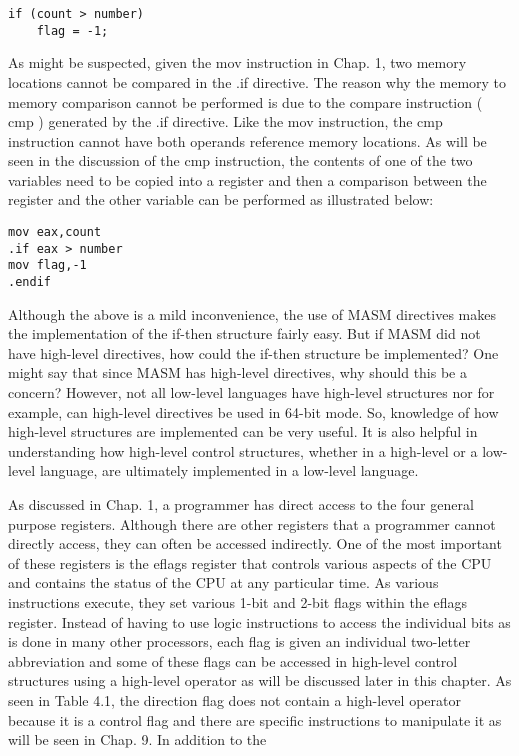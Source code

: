 \documentclass[10pt]{article}
\begin{document}
\begin{verbatim}
if (count > number)
    flag = -1;
\end{verbatim}

As might be suspected, given the mov instruction in Chap. 1, two memory locations cannot be compared in the .if directive. The reason why the memory to memory comparison cannot be performed is due to the compare instruction ( cmp ) generated by the .if directive. Like the mov instruction, the cmp instruction cannot have both operands reference memory locations. As will be seen in the discussion of the cmp instruction, the contents of one of the two variables need to be copied into a register and then a comparison between the register and the other variable can be performed as illustrated below:

\begin{verbatim}
mov eax,count
.if eax > number
mov flag,-1
.endif
\end{verbatim}

Although the above is a mild inconvenience, the use of MASM directives makes the implementation of the if-then structure fairly easy. But if MASM did not have high-level directives, how could the if-then structure be implemented? One might say that since MASM has high-level directives, why should this be a concern? However, not all low-level languages have high-level structures nor for example, can high-level directives be used in 64-bit mode. So, knowledge of how high-level structures are implemented can be very useful. It is also helpful in understanding how high-level control structures, whether in a high-level or a low-level language, are ultimately implemented in a low-level language.

As discussed in Chap. 1, a programmer has direct access to the four general purpose registers. Although there are other registers that a programmer cannot directly access, they can often be accessed indirectly. One of the most important of these registers is the eflags register that controls various aspects of the CPU and contains the status of the CPU at any particular time. As various instructions execute, they set various 1-bit and 2-bit flags within the eflags register. Instead of having to use logic instructions to access the individual bits as is done in many other processors, each flag is given an individual two-letter abbreviation and some of these flags can be accessed in high-level control structures using a high-level operator as will be discussed later in this chapter. As seen in Table 4.1, the direction flag does not contain a high-level operator because it is a control flag and there are specific instructions to manipulate it as will be seen in Chap. 9. In addition to the
\end{document}
